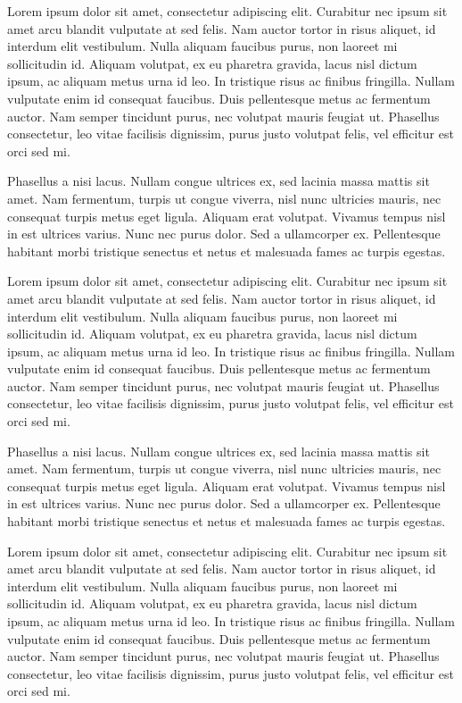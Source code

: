 \documentclass[
  letterpaper,
  DIV=11,
  numbers=noendperiod]{scrreprt}
\begin{document}

Lorem ipsum dolor sit amet, consectetur adipiscing elit. Curabitur nec
ipsum sit amet arcu blandit vulputate at sed felis. Nam auctor tortor in
risus aliquet, id interdum elit vestibulum. Nulla aliquam faucibus
purus, non laoreet mi sollicitudin id. Aliquam volutpat, ex eu pharetra
gravida, lacus nisl dictum ipsum, ac aliquam metus urna id leo. In
tristique risus ac finibus fringilla. Nullam vulputate enim id consequat
faucibus. Duis pellentesque metus ac fermentum auctor. Nam semper
tincidunt purus, nec volutpat mauris feugiat ut. Phasellus consectetur,
leo vitae facilisis dignissim, purus justo volutpat felis, vel efficitur
est orci sed mi.

Phasellus a nisi lacus. Nullam congue ultrices ex, sed lacinia massa
mattis sit amet. Nam fermentum, turpis ut congue viverra, nisl nunc
ultricies mauris, nec consequat turpis metus eget ligula. Aliquam erat
volutpat. Vivamus tempus nisl in est ultrices varius. Nunc nec purus
dolor. Sed a ullamcorper ex. Pellentesque habitant morbi tristique
senectus et netus et malesuada fames ac turpis egestas.

Lorem ipsum dolor sit amet, consectetur adipiscing elit. Curabitur nec
ipsum sit amet arcu blandit vulputate at sed felis. Nam auctor tortor in
risus aliquet, id interdum elit vestibulum. Nulla aliquam faucibus
purus, non laoreet mi sollicitudin id. Aliquam volutpat, ex eu pharetra
gravida, lacus nisl dictum ipsum, ac aliquam metus urna id leo. In
tristique risus ac finibus fringilla. Nullam vulputate enim id consequat
faucibus. Duis pellentesque metus ac fermentum auctor. Nam semper
tincidunt purus, nec volutpat mauris feugiat ut. Phasellus consectetur,
leo vitae facilisis dignissim, purus justo volutpat felis, vel efficitur
est orci sed mi.

Phasellus a nisi lacus. Nullam congue ultrices ex, sed lacinia massa
mattis sit amet. Nam fermentum, turpis ut congue viverra, nisl nunc
ultricies mauris, nec consequat turpis metus eget ligula. Aliquam erat
volutpat. Vivamus tempus nisl in est ultrices varius. Nunc nec purus
dolor. Sed a ullamcorper ex. Pellentesque habitant morbi tristique
senectus et netus et malesuada fames ac turpis egestas.

\newpage

Lorem ipsum dolor sit amet, consectetur adipiscing elit. Curabitur nec
ipsum sit amet arcu blandit vulputate at sed felis. Nam auctor tortor in
risus aliquet, id interdum elit vestibulum. Nulla aliquam faucibus
purus, non laoreet mi sollicitudin id. Aliquam volutpat, ex eu pharetra
gravida, lacus nisl dictum ipsum, ac aliquam metus urna id leo. In
tristique risus ac finibus fringilla. Nullam vulputate enim id consequat
faucibus. Duis pellentesque metus ac fermentum auctor. Nam semper
tincidunt purus, nec volutpat mauris feugiat ut. Phasellus consectetur,
leo vitae facilisis dignissim, purus justo volutpat felis, vel efficitur
est orci sed mi.
\end{document}
